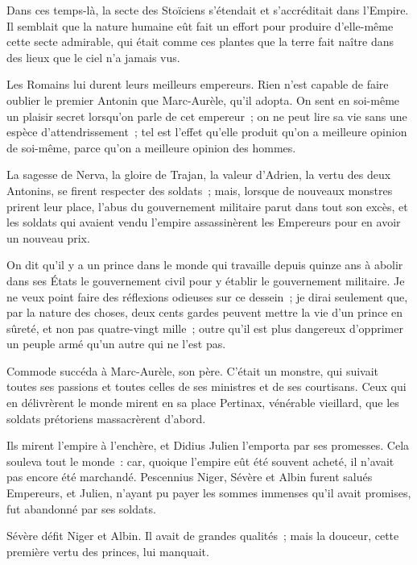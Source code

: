 \documentclass[french,twoside]{book} %
\newcommand\chaptercont{} %
\begin{document}
\chaptercont
\noindent Dans ces temps-là, la secte des Stoïciens s’étendait et s’accréditait dans l’Empire. Il semblait que la nature humaine eût fait un effort pour produire d’elle-même cette secte admirable, qui était comme ces plantes que la terre fait naître dans des lieux que le ciel n’a jamais vus.\par
Les Romains lui durent leurs meilleurs empereurs. Rien n’est capable de faire oublier le premier Antonin que Marc-Aurèle, qu’il adopta. On sent en soi-même un plaisir secret lorsqu’on parle de cet empereur ; on ne peut lire sa vie sans une espèce d’attendrissement ; tel est l’effet qu’elle produit qu’on a meilleure opinion de soi-même, parce qu’on a meilleure opinion des hommes.\par
La sagesse de Nerva, la gloire de Trajan, la valeur d’Adrien, la vertu des deux Antonins, se firent respecter des soldats ; mais, lorsque de nouveaux monstres prirent leur place, l’abus du gouvernement militaire parut dans tout son excès, et les soldats qui avaient vendu l’empire assassinèrent les Empereurs pour en avoir un nouveau prix.\par
On dit qu’il y a un prince dans le monde qui travaille depuis quinze ans à abolir dans ses États le gouvernement civil pour y établir le gouvernement militaire. Je ne veux point faire des réflexions odieuses sur ce dessein ; je dirai seulement que, par la nature des choses, deux cents gardes peuvent mettre la vie d’un prince en sûreté, et non pas quatre-vingt mille ; outre qu’il est plus dangereux d’opprimer un peuple armé qu’un autre qui ne l’est pas.\par
Commode succéda à Marc-Aurèle, son père. C’était un monstre, qui suivait toutes ses passions et toutes celles de ses ministres et de ses courtisans. Ceux qui en délivrèrent le monde mirent en sa place Pertinax, vénérable vieillard, que les soldats prétoriens massacrèrent d’abord.\par
Ils mirent l’empire à l’enchère, et Didius Julien l’emporta par ses promesses. Cela souleva tout le monde : car, quoique l’empire eût été souvent acheté, il n’avait pas encore été marchandé. Pescennius Niger, Sévère et Albin furent salués Empereurs, et Julien, n’ayant pu payer les sommes immenses qu’il avait promises, fut abandonné par ses soldats.\par
Sévère défit Niger et Albin. Il avait de grandes qualités ; mais la douceur, cette première vertu des princes, lui manquait.\par
\end{document}

